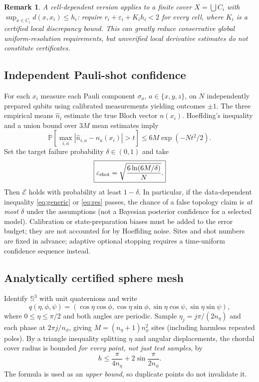 \documentclass[aps,prd,onecolumn,notitlepage,11pt,superscriptaddress,longbibliography]{revtex4-2}
\newtheorem{remark}{Remark}
\newcommand{\Sph}{\mathbb S}
\newcommand{\Prob}{\mathbb P}
\begin{document}
\begin{remark}
A cell-dependent version applies to a finite cover $X=\bigcup C_i$ with $\sup_{x\in C_i}d(x,x_i)\le h_i$: require $r_i+\varepsilon_i+K_i h_i<2$ for every cell, where $K_i$ is a certified local discrepancy bound. This can greatly reduce conservative global uniform-resolution requirements, but unverified local derivative estimates do not constitute certificates.
\end{remark}

\subsection{Independent Pauli-shot confidence}
For each $x_i$ measure each Pauli component $\sigma_a$, $a\in\{x,y,z\}$, on $N$ independently prepared qubits using calibrated measurements yielding outcomes $\pm1$. The three empirical means $\widehat n_i$ estimate the true Bloch vector $n(x_i)$. Hoeffding's inequality and a union bound over $3M$ mean estimates imply
\begin{equation}
\Prob\left[\max_{i,a}|\widehat n_{i,a}-n_a(x_i)|>t\right]\le6M\exp(-Nt^2/2).
\end{equation}
Set the target failure probability $\delta\in(0,1)$ and take
\begin{equation}\label{eq:shot}
\boxed{\varepsilon_{\rm shot}=\sqrt{\frac{6\ln(6M/\delta)}{N}}.}
\end{equation}
Then $\mathcal E$ holds with probability at least $1-\delta$. In particular, if the data-dependent inequality \eqref{eq:generic} or \eqref{eq:res} passes, the chance of a false topology claim is \emph{at most $\delta$} under the assumptions (not a Bayesian posterior confidence for a selected model). Calibration or state-preparation biases must be added to the error budget; they are not accounted for by Hoeffding noise. Sites and shot numbers are fixed in advance; adaptive optional stopping requires a time-uniform confidence sequence instead.

\subsection{Analytically certified sphere mesh}
Identify $\Sph^3$ with unit quaternions and write
\begin{equation}
q(\eta,\phi,\psi)=(\cos\eta\cos\phi,\cos\eta\sin\phi,\sin\eta\cos\psi,\sin\eta\sin\psi),
\end{equation}
where $0\le\eta\le\pi/2$ and both angles are periodic. Sample $\eta_j=j\pi/(2n_\eta)$ and each phase at $2\pi j/n_\phi$, giving $M=(n_\eta+1)n_\phi^2$ sites (including harmless repeated poles). By a triangle inequality splitting $\eta$ and angular displacements, the chordal cover radius is bounded \emph{for every point, not just test samples}, by
\begin{equation}\label{eq:cover}
\boxed{h\le\frac{\pi}{4n_\eta}+2\sin\frac{\pi}{2n_\phi}.}
\end{equation}
The formula is used as an \emph{upper bound}, so duplicate points do not invalidate it.
\end{document}
